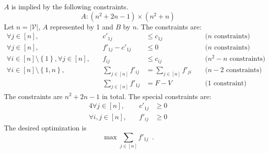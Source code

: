 $A$ is implied by the following constraints.
\begin{equation*}
  A : \left(n^2 + 2n - 1\right) \times \left(n^2 + n\right)
\end{equation*}
Let $n = |\mathcal{V}|$, $A$ represented by 1 and $B$ by $n$. The constraints are:
\begin{equation}
\label{lp:primal:constraints}
\begin{alignedat}{4}
  \forall j \in \left[n\right], && c'_{1j} &\leq c_{1j} &&\mbox{ ($n$ constraints)} \\
  \forall j \in \left[n\right], &\:& f'_{1j} - c'_{1j} &\leq 0 &&\mbox{ ($n$ constraints)} \\
  \forall i \in \left[n\right] \setminus \left\{1\right\}, \forall j \in \left[n\right], && f_{ij} &\leq c_{ij}
    &&\mbox{ ($n^2 - n$ constraints)} \\
  \forall i \in \left[n\right] \setminus \left\{1, n\right\}, && \sum\limits_{j \in \left[n\right]}f'_{ij} &=
    \sum\limits_{j \in \left[n\right]}f'_{ji} &&\mbox{ ($n-2$ constraints)} \\
  && \sum\limits_{j \in \left[n\right]}f'_{1j} &= F - V &&\mbox{ (1 constraint)}
\end{alignedat}
\end{equation}
The constraints are $n^2 + 2n - 1$ in total. The special constraints are:
\begin{alignat*}{4}
  \forall j \in \left[n\right], &\:& c'_{1j} &\geq 0 \\
  \forall i, j \in \left[n\right], &\:& f'_{ij} &\geq 0
\end{alignat*}
The desired optimization is
\begin{equation*}
  \max{\sum\limits_{j \in \left[n\right]}f'_{1j}} \enspace.
\end{equation*}

